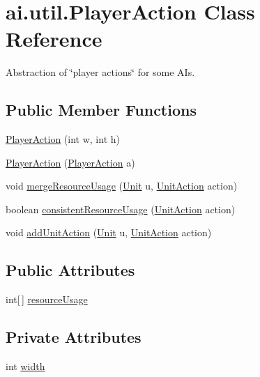 \hypertarget{classai_1_1util_1_1_player_action}{
\section{ai.util.PlayerAction Class Reference}
\label{classai_1_1util_1_1_player_action}
}


Abstraction of \char`\"{}player actions\char`\"{} for some AIs.  


\subsection*{Public Member Functions}
\begin{DoxyCompactItemize}
\item 
\hyperlink{classai_1_1util_1_1_player_action_a3db4a44b02002c8d53694fabcecfc067}{PlayerAction} (int w, int h)
\item 
\hyperlink{classai_1_1util_1_1_player_action_a01610df4b416e68e1450eddb662c68aa}{PlayerAction} (\hyperlink{classai_1_1util_1_1_player_action}{PlayerAction} a)
\item 
void \hyperlink{classai_1_1util_1_1_player_action_a3abe3290da866a426b65c32f86ed9e13}{mergeResourceUsage} (\hyperlink{classrts_1_1units_1_1_unit}{Unit} u, \hyperlink{classrts_1_1units_1_1_unit_action}{UnitAction} action)
\item 
boolean \hyperlink{classai_1_1util_1_1_player_action_ac0a837a9dcff82e8eca20d4e1b90eccb}{consistentResourceUsage} (\hyperlink{classrts_1_1units_1_1_unit_action}{UnitAction} action)
\item 
void \hyperlink{classai_1_1util_1_1_player_action_a23a9938b7bdcf6e5679af1028cab95f6}{addUnitAction} (\hyperlink{classrts_1_1units_1_1_unit}{Unit} u, \hyperlink{classrts_1_1units_1_1_unit_action}{UnitAction} action)
\end{DoxyCompactItemize}
\subsection*{Public Attributes}
\begin{DoxyCompactItemize}
\item 
int\mbox{[}$\,$\mbox{]} \hyperlink{classai_1_1util_1_1_player_action_a88efa8861a83cecf3c698205e2dd602d}{resourceUsage}
\end{DoxyCompactItemize}
\subsection*{Private Attributes}
\begin{DoxyCompactItemize}
\item 
int \hyperlink{classai_1_1util_1_1_player_action_aa4ba1d4fcf1fb7b2daf43ced71798275}{width}
\end{DoxyCompactItemize}


